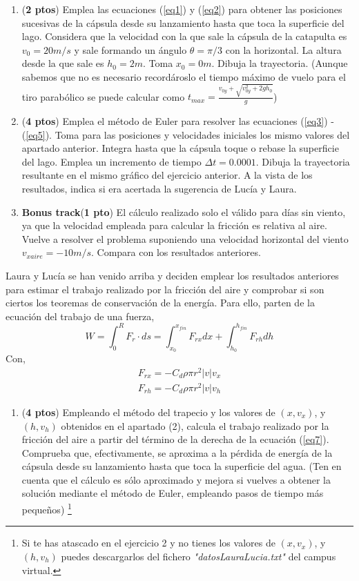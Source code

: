 \begin{enumerate}
	\item (\textbf{2 ptos}) Emplea las ecuaciones (\ref{eq1}) y (\ref{eq2}) para obtener las posiciones sucesivas de la cápsula desde su lanzamiento hasta que toca la superficie del lago. Considera que la velocidad con la que sale la cápsula de la catapulta es $v_0 = 20 m/s$ y sale formando un ángulo $\theta = \pi/3$ con la horizontal. La altura desde la que sale es $h_0 = 2m$. Toma $x_0=0m$. Dibuja la trayectoria. (Aunque sabemos que no es necesario recordároslo el tiempo máximo de vuelo para el tiro parabólico se puede calcular como $t_{max} = \frac{v_{0y} + \sqrt{v_{0y}^2+2gh_0}}{g}$)
	
	
	\item (\textbf{4 ptos}) Emplea el método de Euler para resolver las ecuaciones (\ref{eq3}) - (\ref{eq5}). Toma para las posiciones y velocidades iniciales los mismo valores del apartado anterior. Integra hasta que la cápsula toque o rebase la superficie del lago. Emplea un incremento de tiempo $\Delta t = 0.0001$. Dibuja la trayectoria resultante en el mismo gráfico del ejercicio anterior.
	A la vista de los resultados, indica si era acertada la sugerencia de Lucía y Laura.
	
	\item \textbf{Bonus track}(\textbf{1 pto}) El cálculo realizado solo el válido para días sin viento, ya que la velocidad empleada para calcular la fricción es relativa al aire. Vuelve a resolver el problema suponiendo una velocidad horizontal del viento $v_{xaire} = -10 m/s$. Compara con los resultados anteriores.
\end{enumerate}
Laura y Lucía se han venido arriba y deciden emplear los resultados anteriores para estimar el trabajo realizado por la fricción del aire y comprobar si son ciertos los teoremas de conservación de la energía.
Para ello, parten de la ecuación del trabajo de una fuerza,
\begin{equation}\label{eq7}
	W = \int_0^R F_r\cdot ds = \int_{x_0}^{x_{fin}}F_{rx}dx + \int_{h_0}^{h_{fin}} F_{rh}dh
\end{equation}
Con,
\begin{align}
	F_{rx} = - C_d\rho\pi r^2|v|v_x\\
	F_{rh} = - C_d\rho\pi r^2|v|v_h
\end{align}
\begin{enumerate}[resume]
	\item (\textbf{4 ptos}) Empleando el método del trapecio y los valores de $(x,v_x)$, y $(h,v_h)$ obtenidos en el apartado (2), calcula el trabajo realizado por la fricción del aire a partir del término de la derecha de la ecuación (\ref{eq7}).
	Comprueba que, efectivamente, se aproxima a la pérdida de energía de la cápsula desde su lanzamiento hasta que toca la superficie del agua. (Ten en cuenta que el cálculo es sólo aproximado y mejora si vuelves a obtener la solución mediante el método de Euler, empleando pasos de tiempo más pequeños) \footnote{Si te has atascado en el ejercicio 2 y no tienes los valores de  $(x,v_x)$, y $(h,v_h)$ puedes descargarlos del fichero \textit{"datosLauraLucia.txt"} del campus virtual.}
\end{enumerate}